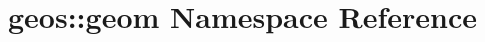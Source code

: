 \hypertarget{namespacegeos_1_1geom}{}\section{geos\+:\+:geom Namespace Reference}
\label{namespacegeos_1_1geom}
